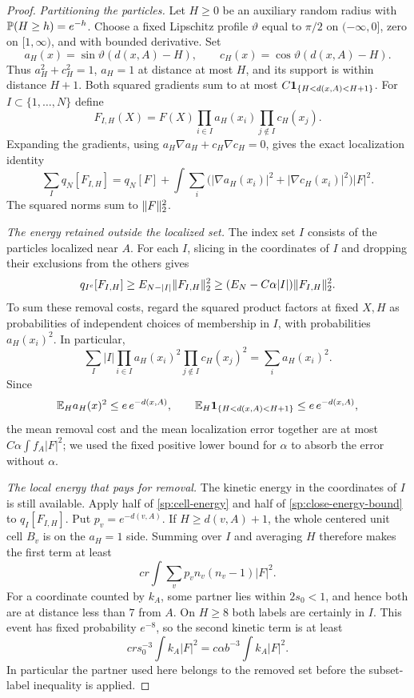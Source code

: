 \begin{proof}
\emph{Partitioning the particles.}
Let $H\ge0$ be an auxiliary random radius with
$\mathbb P(H\ge h)=e^{-h}$.  Choose a fixed Lipschitz profile
$\vartheta$ equal to $\pi/2$ on $(-\infty,0]$, zero on $[1,\infty)$,
and with bounded derivative.  Set
\[
 a_H(x)=\sin\vartheta(d(x,A)-H),\qquad
 c_H(x)=\cos\vartheta(d(x,A)-H).
\]
Thus $a_H^2+c_H^2=1$, $a_H=1$ at distance at most $H$, and
its support is within distance $H+1$.  Both squared gradients sum to
at most $C\mathbf 1_{\{H<d(x,A)<H+1\}}$.
For $I\subset\{1,\ldots,N\}$ define
\[
 F_{I,H}(X)=F(X)\prod_{i\in I}a_H(x_i)
                         \prod_{j\notin I}c_H(x_j).
\]
Expanding the gradients, using $a_H\nabla a_H+c_H\nabla c_H=0$,
gives the exact localization identity
\begin{equation}\label{sp:ims}
 \sum_I q_N[F_{I,H}]
 =q_N[F]+\int\sum_i\bigl(|\nabla a_H(x_i)|^2+
                        |\nabla c_H(x_i)|^2\bigr)|F|^2.
\end{equation}
The squared norms sum to $\lVert F\rVert_2^2$.

\smallskip\noindent\emph{The energy retained outside the localized set.}
The index set $I$ consists of the particles localized near $A$.
For each $I$, slicing in the coordinates of $I$ and dropping their
exclusions from the others gives
\[
 q_{I^c}[F_{I,H}]\ge E_{N-|I|}\lVert F_{I,H}\rVert_2^2
                \ge(E_N-C\alpha|I|)\lVert F_{I,H}\rVert_2^2.
\]
To sum these removal costs, regard the squared product factors at fixed
$X,H$ as probabilities of independent choices of membership in $I$,
with probabilities $a_H(x_i)^2$.  In particular,
\[
 \sum_I |I|\prod_{i\in I}a_H(x_i)^2
                 \prod_{j\notin I}c_H(x_j)^2
       =\sum_i a_H(x_i)^2.
\]
Since
\[
 \mathbb E_H a_H(x)^2\le e\,e^{-d(x,A)},\qquad
 \mathbb E_H\mathbf 1_{\{H<d(x,A)<H+1\}}\le e\,e^{-d(x,A)},
\]
the mean removal cost and the mean localization error together are
at most $C\alpha\int f_A|F|^2$; we used the fixed positive lower
bound for $\alpha$ to absorb the error without $\alpha$.

\smallskip\noindent\emph{The local energy that pays for removal.}
The kinetic energy in the coordinates of $I$ is still available.  Apply half of
\eqref{sp:cell-energy} and half of \eqref{sp:close-energy-bound}
to $q_I[F_{I,H}]$.  Put $p_v=e^{-d(v,A)}$.
If $H\ge d(v,A)+1$, the whole centered unit cell $B_v$ is on the
$a_H=1$ side.  Summing over $I$ and averaging $H$ therefore makes
the first term at least
\[
 cr\int\sum_v p_v n_v(n_v-1)|F|^2.
\]
For a coordinate counted by $k_A$, some partner lies within $2s_0<1$,
and hence both are at distance less than $7$ from $A$.
On $H\ge8$ both labels are certainly in $I$.  This event has fixed
probability $e^{-8}$, so the second kinetic term is at least
\[
 crs_0^{-3}\int k_A|F|^2
        =c\alpha b^{-3}\int k_A|F|^2.
\]
In particular the partner used here belongs to the removed set before
the subset-label inequality is applied.


\end{proof}
